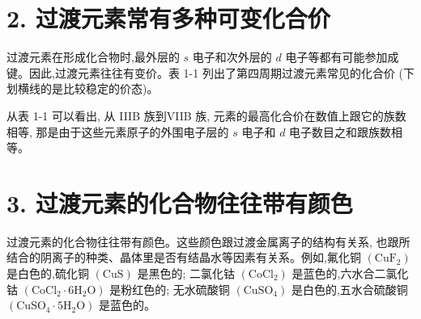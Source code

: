 \documentclass[10pt]{article}
\begin{document}
\begin{center}
\end{center}

\section*{2. 过渡元素常有多种可变化合价}

过渡元素在形成化合物时,最外层的 \(s\) 电子和次外层的 \(d\) 电子等都有可能参加成键。因此,过渡元素往往有变价。表 1-1 列出了第四周期过渡元素常见的化合价 (下划横线的是比较稳定的价态)。

从表 1-1 可以看出, 从 IIIB 族到VIIB 族, 元素的最高化合价在数值上跟它的族数相等, 那是由于这些元素原子的外围电子层的 \(s\) 电子和 \(d\) 电子数目之和跟族数相等。

\section*{3. 过渡元素的化合物往往带有颜色}

过渡元素的化合物往往带有颜色。这些颜色跟过渡金属离子的结构有关系, 也跟所结合的阴离子的种类、晶体里是否有结晶水等因素有关系。例如,氟化铜 \(\left( {\mathrm{{CuF}}}_{2}\right)\) 是白色的,硫化铜 \(\left( \mathrm{{CuS}}\right)\) 是黑色的; 二氯化钴 \(\left( {\mathrm{{CoCl}}}_{2}\right)\) 是蓝色的,六水合二氯化钴 \(\left( {{\mathrm{{CoCl}}}_{2} \cdot 6{\mathrm{H}}_{2}\mathrm{O}}\right)\) 是粉红色的; 无水硫酸铜 \(\left( {\mathrm{{CuSO}}}_{4}\right)\) 是白色的,五水合硫酸铜 \(\left( {{\mathrm{{CuSO}}}_{4} \cdot 5{\mathrm{H}}_{2}\mathrm{O}}\right)\) 是蓝色的。
\end{document}
